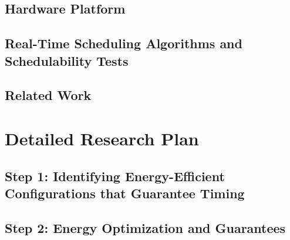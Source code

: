 \documentclass[10pt,letterpaper]{article}
\begin{document}

\subsection{Hardware Platform}
\label{sec:hardware}



\subsection{Real-Time Scheduling Algorithms and Schedulability Tests}
\label{sec:model}




\subsection{Related Work}
\label{sec:relatedwork}



\section{Detailed Research Plan}
\label{sec:researchplan}



\subsection{Step 1: Identifying Energy-Efficient Configurations that Guarantee Timing}
\label{sec:step1}



\subsection{Step 2: Energy Optimization and Guarantees}
\label{sec:step2}


\end{document}

